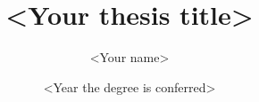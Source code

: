 \title{<Your thesis title>}
\author{<Your name>}
\renewcommand{\maketitlehookc}{\vspace*{\fill}\centering Submitted in partial fulfillment of the \\
requirements for the degree of\\
Doctor of Philosophy\\
in the Graduate School of Arts and Sciences\\
\vspace{1cm}
Columbia University}
\date{<Year the degree is conferred>}
\setlength{\droptitle}{1in}

